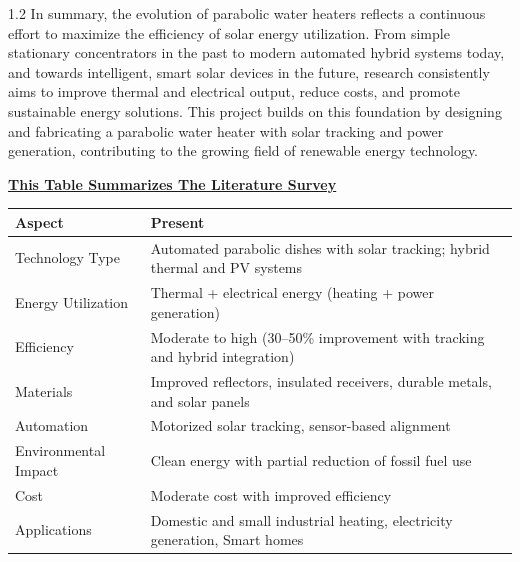 \noindent
\begin{spacing}{1.2}
{\fontsize{10.5}{14.5}\selectfont
In summary, the evolution of parabolic water heaters reflects a continuous effort to maximize the efficiency of solar energy utilization. From simple stationary concentrators in the past to modern automated hybrid systems today, and towards intelligent, smart solar devices in the future, research consistently aims to improve thermal and electrical output, reduce costs, and promote sustainable energy solutions. This project builds on this foundation by designing and fabricating a parabolic water heater with solar tracking and power generation, contributing to the growing field of renewable energy technology.
}
\end{spacing}

\vspace{5mm}
\begin{center}
  {\fontsize{12}{15}\selectfont \bfseries \underline{This Table Summarizes The Literature Survey}}\\[4mm]
\end{center}

\begin{center}
\renewcommand{\arraystretch}{1.3}
\begin{tabular}{|p{38mm}|p{85mm}|}
\hline
\rowcolor{gray!20}
\textbf{Aspect} & \textbf{Present} \\
\hline
Technology Type & Automated parabolic dishes with solar tracking; hybrid thermal and PV systems \\
\hline
Energy Utilization & Thermal + electrical energy (heating + power generation) \\
\hline
Efficiency & Moderate to high (30--50\% improvement with tracking and hybrid integration) \\
\hline
Materials & Improved reflectors, insulated receivers, durable metals, and solar panels \\
\hline
Automation & Motorized solar tracking, sensor-based alignment \\
\hline
Environmental Impact & Clean energy with partial reduction of fossil fuel use \\
\hline
Cost & Moderate cost with improved efficiency \\
\hline
Applications & Domestic and small industrial heating, electricity generation, Smart homes \\
\hline
\end{tabular}
\end{center}
\clearpage
